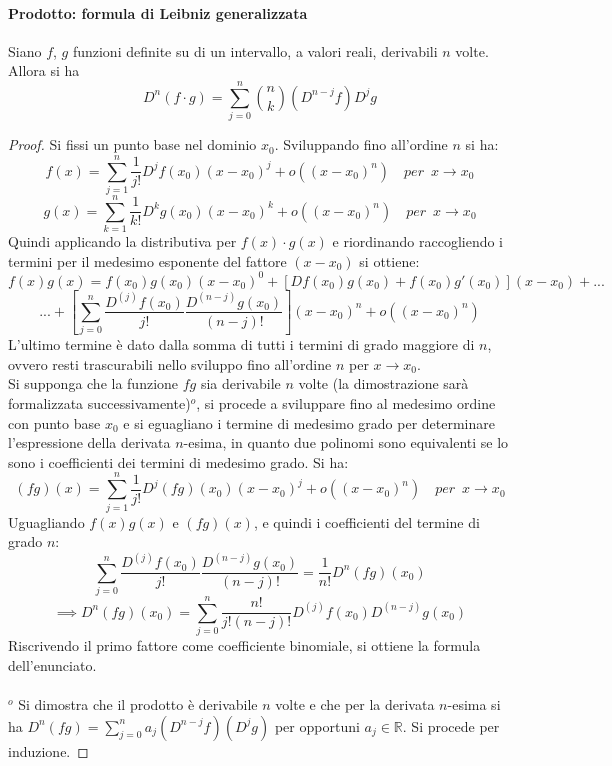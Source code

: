 \documentclass[10pt]{article}
\theoremstyle{plain}
\begin{document}
\paragraph{Prodotto: formula di Leibniz generalizzata}
\begin{ther}
Siano $f$, $g$ funzioni definite su di un intervallo, a valori reali, derivabili $n$ volte. Allora si ha
\[D^n(f \cdot g) = \sum \limits_{j=0}^{n}\binom{n}{k} (D^{n-j}f) D^jg\]
\end{ther}
\begin{proof}
Si fissi un punto base nel dominio $x_0$. Sviluppando fino all'ordine $n$ si ha:
\[f(x) = \sum \limits_{j = 1}^n \frac{1}{j!}D^{j}f(x_0) (x - x_0)^j + o((x-x_0)^n) \quad per \enspace x \rightarrow x_0\]
\[g(x) = \sum \limits_{k = 1}^n \frac{1}{k!}D^{k}g(x_0) (x - x_0)^k + o((x-x_0)^n) \quad per \enspace x \rightarrow x_0\]
Quindi applicando la distributiva per $f(x) \cdot g(x)$ e riordinando raccogliendo i termini per il medesimo esponente del fattore $(x - x_0)$ si ottiene:
\[f(x) g(x) = f(x_0) g(x_0) (x-x_0)^0 + [Df(x_0) g(x_0) + f(x_0) g'(x_0)](x-x_0) + ... \]
\[ ... + [\sum \limits_{j=0}^{n} \frac{D^{(j)}f(x_0)}{j!} \frac{D^{(n-j)}g(x_0)}{(n-j)!}](x-x_0)^n + o((x-x_0)^n)\]
L'ultimo termine è dato dalla somma di tutti i termini di grado maggiore di $n$, ovvero resti trascurabili nello sviluppo fino all'ordine $n$ per $x \rightarrow x_0$.
\\Si supponga che la funzione $fg$ sia derivabile $n$ volte (la dimostrazione sarà formalizzata successivamente)\hyperlink{dopo}{$^o$}, si procede a sviluppare fino al medesimo ordine con punto base $x_0$ e si eguagliano i termine di medesimo grado per determinare l'espressione della derivata $n$-esima, in quanto due polinomi sono equivalenti se lo sono i coefficienti dei termini di medesimo grado. Si ha:
\[(fg)(x) = \sum \limits_{j = 1}^n \frac{1}{j!}D^{j}(fg)(x_0) (x - x_0)^j + o((x-x_0)^n) \quad per \enspace x \rightarrow x_0\]
Uguagliando $f(x)g(x)$ e $(fg)(x)$, e quindi i coefficienti del termine di grado $n$:
\[\sum \limits_{j=0}^{n} \frac{D^{(j)}f(x_0)}{j!} \frac{D^{(n-j)}g(x_0)}{(n-j)!} = \frac{1}{n!}D^{n}(fg)(x_0)\]
\[\implies D^{n}(fg)(x_0) = \sum \limits_{j=0}^{n} \frac{n!}{j! (n-j)!} D^{(j)}f(x_0) D^{(n-j)}g(x_0)\]
Riscrivendo il primo fattore come coefficiente binomiale, si ottiene la formula dell'enunciato.
\\~\\\hypertarget{dopo}{$^o$} Si dimostra che il prodotto è derivabile $n$ volte e che per la derivata $n$-esima si ha $D^n(fg) = \sum \limits_{j=0}^{n} a_j (D^{n-j}f)(D^jg)$ per opportuni $a_j \in \mathbb{R}$. Si procede per induzione.

\end{proof}
\end{document}
